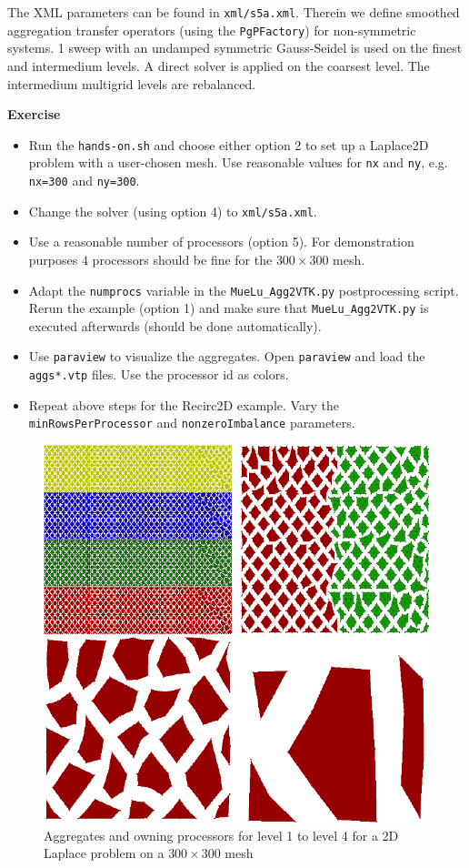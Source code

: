 \documentclass[12pt,a4paper]{article}
\begin{document}
The XML parameters can be found in \verb|xml/s5a.xml|. Therein we define smoothed aggregation transfer operators (using the \verb|PgPFactory|) for non-sym\-metric systems. 1 sweep with an undamped symmetric Gauss-Seidel is used on the finest and intermedium levels. A direct solver is applied on the coarsest level. The intermedium multigrid levels are rebalanced.

\begin{graybox}
 \textbf{Exercise}
 \begin{itemize}
 \item Run the \verb|hands-on.sh| and choose either option 2 to set up a Laplace2D problem with a user-chosen mesh. Use reasonable values for \texttt{nx} and \texttt{ny}, e.g. \verb|nx=300| and \verb|ny=300|.
 \item Change the solver (using option 4) to \verb|xml/s5a.xml|.
 \item Use a reasonable number of processors (option 5). For demonstration purposes $4$ processors should be fine for the $300\times 300$ mesh.
 \item Adapt the \verb|numprocs| variable in the \verb|MueLu_Agg2VTK.py| postprocessing script. Rerun the example (option 1) and make sure that \verb|MueLu_Agg2VTK.py| is executed afterwards (should be done automatically).
 \item Use \verb|paraview| to visualize the aggregates. Open \verb|paraview| and load the \verb|aggs*.vtp| files. Use the processor id as colors.
 \item Repeat above steps for the Recirc2D example. Vary the \verb|minRowsPerProcessor| and \verb|nonzeroImbalance| parameters.
 \end{itemize}
\end{graybox}

\begin{figure}
\includegraphics[width=\textwidth]{images/aggsSymmReb.png} 
\caption{Aggregates and owning processors for level 1 to level 4 for a 2D Laplace problem on a $300\times 300$ mesh}
\label{fig:rebAggs}
\end{figure}
\end{document}
